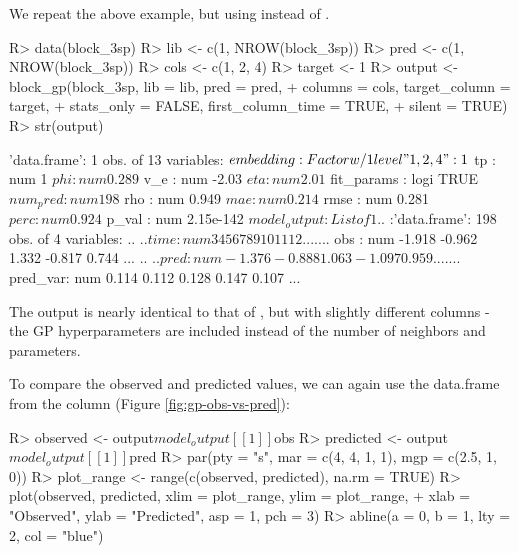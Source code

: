 \documentclass[article]{jss}
\begin{document}
We repeat the above example, but using  instead of . 

\begin{Schunk}
\begin{Sinput}
R> data(block_3sp)
R> lib <- c(1, NROW(block_3sp))
R> pred <- c(1, NROW(block_3sp))
R> cols <- c(1, 2, 4)
R> target <- 1
R> output <- block_gp(block_3sp, lib = lib, pred = pred,
+                     columns = cols, target_column = target,
+                     stats_only = FALSE, first_column_time = TRUE, 
+                     silent = TRUE)
R> str(output)
\end{Sinput}
\begin{Soutput}
'data.frame':	1 obs. of  13 variables:
 $ embedding   : Factor w/ 1 level "1, 2, 4": 1
 $ tp          : num 1
 $ phi         : num 0.289
 $ v_e         : num -2.03
 $ eta         : num 2.01
 $ fit_params  : logi TRUE
 $ num_pred    : num 198
 $ rho         : num 0.949
 $ mae         : num 0.214
 $ rmse        : num 0.281
 $ perc        : num 0.924
 $ p_val       : num 2.15e-142
 $ model_output:List of 1
  ..$ :'data.frame':	198 obs. of  4 variables:
  .. ..$ time    : num  3 4 5 6 7 8 9 10 11 12 ...
  .. ..$ obs     : num  -1.918 -0.962 1.332 -0.817 0.744 ...
  .. ..$ pred    : num  -1.376 -0.888 1.063 -1.097 0.959 ...
  .. ..$ pred_var: num  0.114 0.112 0.128 0.147 0.107 ...
\end{Soutput}
\end{Schunk}

The output is nearly identical to that of , but with slightly different columns - the GP hyperparameters are included instead of the number of neighbors and  parameters.

To compare the observed and predicted values, we can again use the data.frame from the  column (Figure \ref{fig:gp-obs-vs-pred}):

\begin{Schunk}
\begin{Sinput}
R> observed <- output$model_output[[1]]$obs
R> predicted <- output$model_output[[1]]$pred
R> par(pty = "s", mar = c(4, 4, 1, 1), mgp = c(2.5, 1, 0))
R> plot_range <- range(c(observed, predicted), na.rm = TRUE)
R> plot(observed, predicted, xlim = plot_range, ylim = plot_range,
+       xlab = "Observed", ylab = "Predicted", asp = 1, pch = 3)
R> abline(a = 0, b = 1, lty = 2, col = "blue")
\end{Sinput}
\end{Schunk}
\end{document}
